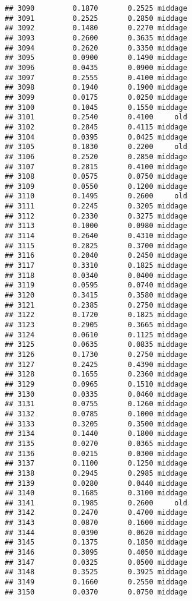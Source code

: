 \documentclass[
]{article}
\begin{document}
\begin{verbatim}
## 3090         0.1870       0.2525 middage
## 3091         0.2525       0.2850 middage
## 3092         0.1480       0.2270 middage
## 3093         0.2600       0.3635 middage
## 3094         0.2620       0.3350 middage
## 3095         0.0900       0.1490 middage
## 3096         0.0435       0.0900 middage
## 3097         0.2555       0.4100 middage
## 3098         0.1940       0.1900 middage
## 3099         0.0175       0.0250 middage
## 3100         0.1045       0.1550 middage
## 3101         0.2540       0.4100     old
## 3102         0.2845       0.4115 middage
## 3104         0.0395       0.0425 middage
## 3105         0.1830       0.2200     old
## 3106         0.2520       0.2850 middage
## 3107         0.2815       0.4100 middage
## 3108         0.0575       0.0750 middage
## 3109         0.0550       0.1200 middage
## 3110         0.1495       0.2600     old
## 3111         0.2245       0.3205 middage
## 3112         0.2330       0.3275 middage
## 3113         0.1000       0.0980 middage
## 3114         0.2640       0.4310 middage
## 3115         0.2825       0.3700 middage
## 3116         0.2040       0.2450 middage
## 3117         0.3310       0.1825 middage
## 3118         0.0340       0.0400 middage
## 3119         0.0595       0.0740 middage
## 3120         0.3415       0.3580 middage
## 3121         0.2385       0.2750 middage
## 3122         0.1720       0.1825 middage
## 3123         0.2905       0.3665 middage
## 3124         0.0610       0.1125 middage
## 3125         0.0635       0.0835 middage
## 3126         0.1730       0.2750 middage
## 3127         0.2425       0.4390 middage
## 3128         0.1655       0.2360 middage
## 3129         0.0965       0.1510 middage
## 3130         0.0335       0.0460 middage
## 3131         0.0755       0.1260 middage
## 3132         0.0785       0.1000 middage
## 3133         0.3205       0.3500 middage
## 3134         0.1440       0.1800 middage
## 3135         0.0270       0.0365 middage
## 3136         0.0215       0.0300 middage
## 3137         0.1100       0.1250 middage
## 3138         0.2945       0.2985 middage
## 3139         0.0280       0.0440 middage
## 3140         0.1685       0.3100 middage
## 3141         0.1985       0.2600     old
## 3142         0.2470       0.4700 middage
## 3143         0.0870       0.1600 middage
## 3144         0.0390       0.0620 middage
## 3145         0.1375       0.1850 middage
## 3146         0.3095       0.4050 middage
## 3147         0.0325       0.0500 middage
## 3148         0.3525       0.3925 middage
## 3149         0.1660       0.2550 middage
## 3150         0.0370       0.0750 middage

\end{verbatim}
\end{document}
